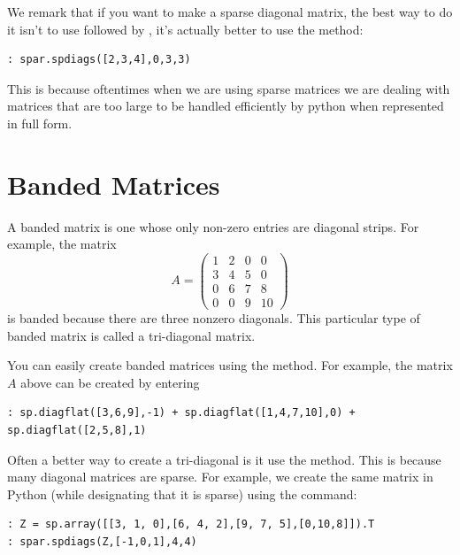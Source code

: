 We remark that if you want to make a sparse diagonal matrix, the
best way to do it isn't to use  followed by ,
it's actually better to use the  method:
\begin{lstlisting}
: spar.spdiags([2,3,4],0,3,3)
\end{lstlisting}
This is because oftentimes when we are using sparse matrices we are dealing with matrices 
that are too large to be handled efficiently by python when represented in full form.

\section*{Banded Matrices}
A banded matrix is one whose only non-zero entries are diagonal
strips.  For example, the matrix
\begin{equation*}
A = \begin{pmatrix} 1&2&0&0\\3&4&5&0\\0&6&7&8\\0&0&9&10
\end{pmatrix}
\end{equation*}
is banded because there are three nonzero diagonals.  This
particular type of banded matrix is called a tri-diagonal matrix.

You can easily create banded matrices using the  method.
For example, the matrix $A$ above can be created by entering
\begin{lstlisting}
: sp.diagflat([3,6,9],-1) + sp.diagflat([1,4,7,10],0) + sp.diagflat([2,5,8],1)
\end{lstlisting}

Often a better way to create a tri-diagonal is it use the  method. 
This is because many diagonal matrices are sparse. 
For example, we create the same matrix in Python (while designating that it is sparse) using the command:
\begin{lstlisting}
: Z = sp.array([[3, 1, 0],[6, 4, 2],[9, 7, 5],[0,10,8]]).T
: spar.spdiags(Z,[-1,0,1],4,4)
\end{lstlisting}

